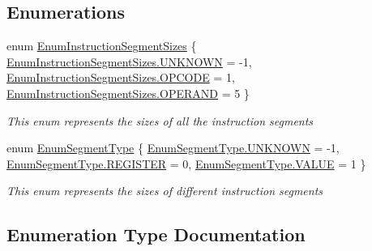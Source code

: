 \subsection*{Enumerations}
\begin{DoxyCompactItemize}
\item 
enum \hyperlink{namespace_c_p_u___o_s___simulator_1_1_compiler_1_1_backend_a366a7efa6fcfb05aa404e76da1cf3c5e}{Enum\+Instruction\+Segment\+Sizes} \{ \hyperlink{namespace_c_p_u___o_s___simulator_1_1_compiler_1_1_backend_a366a7efa6fcfb05aa404e76da1cf3c5ea696b031073e74bf2cb98e5ef201d4aa3}{Enum\+Instruction\+Segment\+Sizes.\+U\+N\+K\+N\+O\+W\+N} = -\/1, 
\hyperlink{namespace_c_p_u___o_s___simulator_1_1_compiler_1_1_backend_a366a7efa6fcfb05aa404e76da1cf3c5ea11bdee9fdefbd8d33a25257557bddbef}{Enum\+Instruction\+Segment\+Sizes.\+O\+P\+C\+O\+D\+E} = 1, 
\hyperlink{namespace_c_p_u___o_s___simulator_1_1_compiler_1_1_backend_a366a7efa6fcfb05aa404e76da1cf3c5ea11f3de9b2b548c31805cf34d512ee177}{Enum\+Instruction\+Segment\+Sizes.\+O\+P\+E\+R\+A\+N\+D} = 5
 \}\begin{DoxyCompactList}\small\item\em This enum represents the sizes of all the instruction segments \end{DoxyCompactList}
\item 
enum \hyperlink{namespace_c_p_u___o_s___simulator_1_1_compiler_1_1_backend_a39bd0e4034345155514db8f136c9c639}{Enum\+Segment\+Type} \{ \hyperlink{namespace_c_p_u___o_s___simulator_1_1_compiler_1_1_backend_a39bd0e4034345155514db8f136c9c639a696b031073e74bf2cb98e5ef201d4aa3}{Enum\+Segment\+Type.\+U\+N\+K\+N\+O\+W\+N} = -\/1, 
\hyperlink{namespace_c_p_u___o_s___simulator_1_1_compiler_1_1_backend_a39bd0e4034345155514db8f136c9c639ad17455cfcb88a53f1603fb817e09c2d6}{Enum\+Segment\+Type.\+R\+E\+G\+I\+S\+T\+E\+R} = 0, 
\hyperlink{namespace_c_p_u___o_s___simulator_1_1_compiler_1_1_backend_a39bd0e4034345155514db8f136c9c639aecc2e9c313faddb07e7da223c1dc5c3f}{Enum\+Segment\+Type.\+V\+A\+L\+U\+E} = 1
 \}\begin{DoxyCompactList}\small\item\em This enum represents the sizes of different instruction segments \end{DoxyCompactList}
\end{DoxyCompactItemize}


\subsection{Enumeration Type Documentation}
\hypertarget{namespace_c_p_u___o_s___simulator_1_1_compiler_1_1_backend_a366a7efa6fcfb05aa404e76da1cf3c5e}{}
